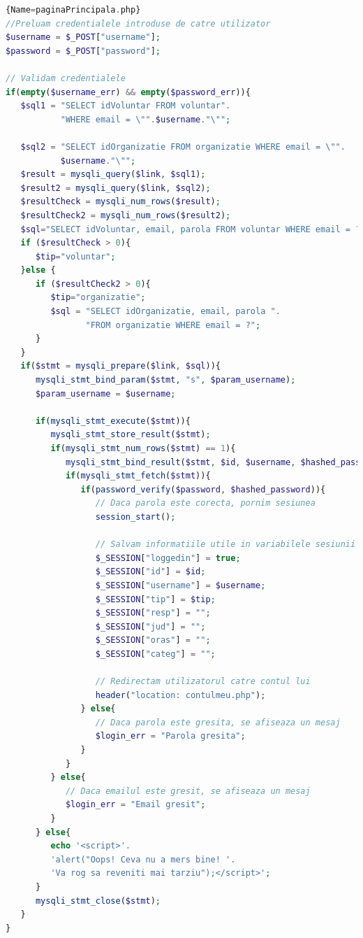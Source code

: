 \documentclass[12pt,a4paper]{report}
\begin{document}
\begin{lstlisting}[basicstyle=\small, language=PHP]{Name=paginaPrincipala.php}
//Preluam credentialele introduse de catre utilizator
$username = $_POST["username"];
$password = $_POST["password"];

// Validam credentialele
if(empty($username_err) && empty($password_err)){
   $sql1 = "SELECT idVoluntar FROM voluntar". 
           "WHERE email = \"".$username."\"";

   $sql2 = "SELECT idOrganizatie FROM organizatie WHERE email = \"".
           $username."\"";
   $result = mysqli_query($link, $sql1);
   $result2 = mysqli_query($link, $sql2);
   $resultCheck = mysqli_num_rows($result);
   $resultCheck2 = mysqli_num_rows($result2);
   $sql="SELECT idVoluntar, email, parola FROM voluntar WHERE email = ?";
   if ($resultCheck > 0){
      $tip="voluntar";
   }else {
      if ($resultCheck2 > 0){
         $tip="organizatie";
         $sql = "SELECT idOrganizatie, email, parola ".
                "FROM organizatie WHERE email = ?";
      }
   }
   if($stmt = mysqli_prepare($link, $sql)){
      mysqli_stmt_bind_param($stmt, "s", $param_username);
      $param_username = $username;

      if(mysqli_stmt_execute($stmt)){
         mysqli_stmt_store_result($stmt);
         if(mysqli_stmt_num_rows($stmt) == 1){
            mysqli_stmt_bind_result($stmt, $id, $username, $hashed_password);
            if(mysqli_stmt_fetch($stmt)){
               if(password_verify($password, $hashed_password)){
                  // Daca parola este corecta, pornim sesiunea
                  session_start();

                  // Salvam informatiile utile in variabilele sesiunii
                  $_SESSION["loggedin"] = true;
                  $_SESSION["id"] = $id;
                  $_SESSION["username"] = $username;
                  $_SESSION["tip"] = $tip;
                  $_SESSION["resp"] = "";
                  $_SESSION["jud"] = "";
                  $_SESSION["oras"] = "";
                  $_SESSION["categ"] = "";

                  // Redirectam utilizatorul catre contul lui
                  header("location: contulmeu.php");
               } else{
                  // Daca parola este gresita, se afiseaza un mesaj
                  $login_err = "Parola gresita";
               }
            }
         } else{
            // Daca emailul este gresit, se afiseaza un mesaj
            $login_err = "Email gresit";
         }
      } else{
         echo '<script>'.
         'alert("Oops! Ceva nu a mers bine! '.
         'Va rog sa reveniti mai tarziu");</script>';
      }
      mysqli_stmt_close($stmt);
   }
}
\end{lstlisting}
\end{document}
